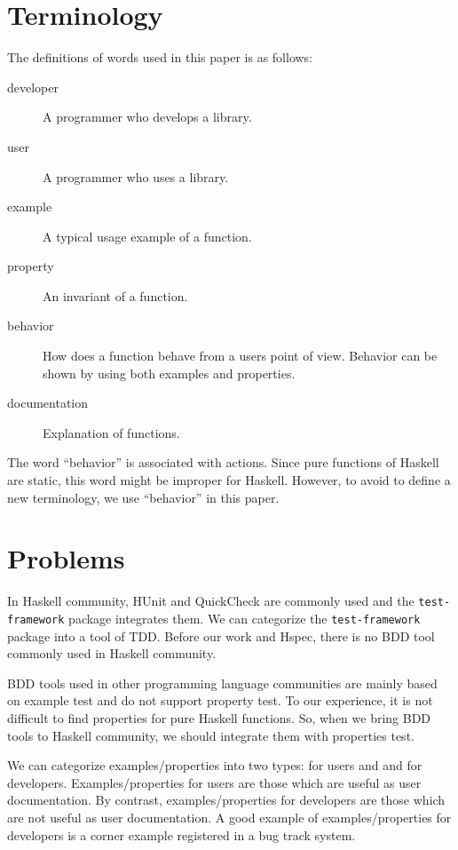 \documentclass[preprint]{sigplanconf}
\newcommand{\hspec}{Hspec}
\begin{document}
\section{Terminology}

The definitions of words used in this paper is as follows:

\begin{description}
\item[developer]
    A programmer who develops a library.
\item[user]
    A programmer who uses a library.
\item[example]
    A typical usage example of a function.
\item[property]
    An invariant of a function.
\item[behavior]
    How does a function behave from a users point of view. Behavior can be
    shown by using both examples and properties.
\item[documentation] Explanation of functions.
\end{description}

The word ``behavior'' is associated with actions.
Since pure functions of Haskell are static,
this word might be improper for Haskell.
However, to avoid to define a new terminology,
we use ``behavior'' in this paper.

\section{Problems}

In Haskell community, HUnit and QuickCheck are commonly used %
and the {\tt test-framework} package integrates them.
We can categorize the {\tt test-framework} package into
a tool of TDD.
Before our work and \hspec{}, there is no BDD tool commonly used in Haskell community.

BDD tools used in other programming language communities are
mainly based on example test
and do not support property test.
To our experience, it is not difficult to find properties for
pure Haskell functions.
So, when we bring BDD tools to
Haskell community, we should integrate them with properties test.

We can categorize examples/properties into two types: for users and
and for developers.
Examples/properties for users are those which are useful as user documentation.
By contrast, examples/properties for developers are
those which are not useful as user documentation.
A good example of examples/properties for developers
is a corner example registered in a bug track system.
\end{document}
